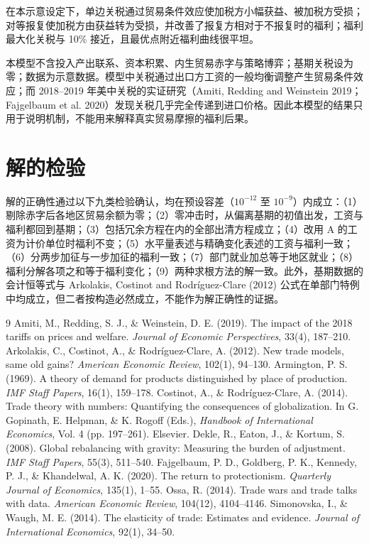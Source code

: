 \documentclass[11pt,a4paper]{ctexart}
\begin{document}
在本示意设定下，单边关税通过贸易条件效应使加税方小幅获益、被加税方受损；对等报复使加税方由获益转为受损，并改善了报复方相对于不报复时的福利；福利最大化关税与 10\% 接近，且最优点附近福利曲线很平坦。

本模型不含投入产出联系、资本积累、内生贸易赤字与策略博弈；基期关税设为零；数据为示意数据。模型中关税通过出口方工资的一般均衡调整产生贸易条件效应；而 2018--2019 年美中关税的实证研究（Amiti, Redding and Weinstein 2019；Fajgelbaum et al. 2020）发现关税几乎完全传递到进口价格。因此本模型的结果只用于说明机制，不能用来解释真实贸易摩擦的福利后果。

\appendix
\section{解的检验}

解的正确性通过以下九类检验确认，均在预设容差（$10^{-12}$ 至 $10^{-9}$）内成立：（1）剔除赤字后各地区贸易余额为零；（2）零冲击时，从偏离基期的初值出发，工资与福利都回到基期；（3）包括冗余方程在内的全部出清方程成立；（4）改用 A 的工资为计价单位时福利不变；（5）水平量表述与精确变化表述的工资与福利一致；（6）分两步加征与一步加征的福利一致；（7）部门就业加总等于地区就业；（8）福利分解各项之和等于福利变化；（9）两种求根方法的解一致。此外，基期数据的会计恒等式与 Arkolakis, Costinot and Rodríguez-Clare (2012) 公式在单部门特例中均成立，但二者按构造必然成立，不能作为解正确性的证据。

\begin{thebibliography}{9}
 Amiti, M., Redding, S. J., \& Weinstein, D. E. (2019). The impact of the 2018 tariffs on prices and welfare. \textit{Journal of Economic Perspectives}, 33(4), 187--210.
 Arkolakis, C., Costinot, A., \& Rodríguez-Clare, A. (2012). New trade models, same old gains? \textit{American Economic Review}, 102(1), 94--130.
 Armington, P. S. (1969). A theory of demand for products distinguished by place of production. \textit{IMF Staff Papers}, 16(1), 159--178.
 Costinot, A., \& Rodríguez-Clare, A. (2014). Trade theory with numbers: Quantifying the consequences of globalization. In G. Gopinath, E. Helpman, \& K. Rogoff (Eds.), \textit{Handbook of International Economics}, Vol. 4 (pp. 197--261). Elsevier.
 Dekle, R., Eaton, J., \& Kortum, S. (2008). Global rebalancing with gravity: Measuring the burden of adjustment. \textit{IMF Staff Papers}, 55(3), 511--540.
 Fajgelbaum, P. D., Goldberg, P. K., Kennedy, P. J., \& Khandelwal, A. K. (2020). The return to protectionism. \textit{Quarterly Journal of Economics}, 135(1), 1--55.
 Ossa, R. (2014). Trade wars and trade talks with data. \textit{American Economic Review}, 104(12), 4104--4146.
 Simonovska, I., \& Waugh, M. E. (2014). The elasticity of trade: Estimates and evidence. \textit{Journal of International Economics}, 92(1), 34--50.
\end{thebibliography}
\end{document}
